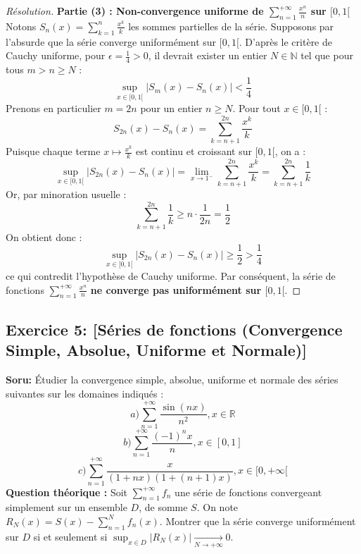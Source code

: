 \documentclass[12pt,a4paper]{report}
\begin{document}
\begin{proof}[Résolution]
\textbf{Partie (3) : Non-convergence uniforme de $\sum_{n=1}^{+\infty} \frac{x^n}{n}$ sur $[0, 1[$}
Notons $S_n(x) = \sum_{k=1}^n \frac{x^k}{k}$ les sommes partielles de la série.
Supposons par l'absurde que la série converge uniformément sur $[0, 1[$.
D'après le critère de Cauchy uniforme, pour $\epsilon = \frac{1}{4} > 0$, il devrait exister un entier $N \in \mathbb{N}$ tel que pour tous $m > n \ge N$ :
\[ \sup_{x \in [0, 1[} |S_m(x) - S_n(x)| < \frac{1}{4} \]
Prenons en particulier $m = 2n$ pour un entier $n \ge N$. Pour tout $x \in [0, 1[$ :
\[ S_{2n}(x) - S_n(x) = \sum_{k=n+1}^{2n} \frac{x^k}{k} \]
Puisque chaque terme $x \mapsto \frac{x^k}{k}$ est continu et croissant sur $[0, 1[$, on a :
\[ \sup_{x \in [0, 1[} |S_{2n}(x) - S_n(x)| = \lim_{x \to 1^-} \sum_{k=n+1}^{2n} \frac{x^k}{k} = \sum_{k=n+1}^{2n} \frac{1}{k} \]
Or, par minoration usuelle :
\[ \sum_{k=n+1}^{2n} \frac{1}{k} \ge n \cdot \frac{1}{2n} = \frac{1}{2} \]
On obtient donc :
\[ \sup_{x \in [0, 1[} |S_{2n}(x) - S_n(x)| \ge \frac{1}{2} > \frac{1}{4} \]
ce qui contredit l'hypothèse de Cauchy uniforme.
Par conséquent, la série de fonctions $\sum_{n=1}^{+\infty} \frac{x^n}{n}$ \textbf{ne converge pas uniformément sur $[0, 1[$}.
\end{proof}

\subsection*{Exercice 5: [Séries de fonctions (Convergence Simple, Absolue, Uniforme et Normale)]}

\textbf{Soru:}
Étudier la convergence simple, absolue, uniforme et normale des séries suivantes sur les domaines indiqués :
\[ a) \sum_{n=1}^{+\infty} \frac{\sin(nx)}{n^2}, x \in \mathbb{R} \]
\[ b) \sum_{n=1}^{+\infty} \frac{(-1)^n x}{n}, x \in [0, 1] \]
\[ c) \sum_{n=1}^{+\infty} \frac{x}{(1+nx)(1+(n+1)x)}, x \in [0, +\infty[ \]
\textbf{Question théorique :} Soit $\sum_{n=1}^{+\infty} f_n$ une série de fonctions convergeant simplement sur un ensemble $D$, de somme $S$. On note $R_N(x) = S(x) - \sum_{n=1}^N f_n(x)$.
Montrer que la série converge uniformément sur $D$ si et seulement si $\sup_{x \in D} |R_N(x)| \xrightarrow[N \to +\infty]{} 0$.
\end{document}

